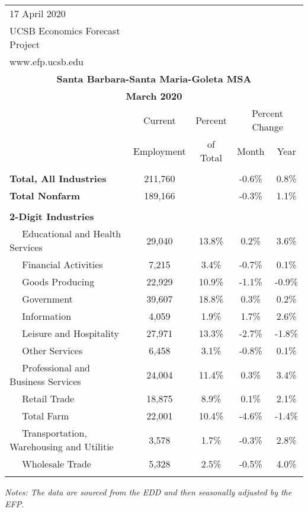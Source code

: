 \documentclass[12pt]{article}
\begin{document}
\begin{landscape}
\begin{table}
\begin{tabular}{|l|c|c|c|c|}
\multicolumn{1}{l}{\small 17 April 2020} & \multicolumn{4}{c}{} \\
\multicolumn{1}{l}{\small UCSB Economics Forecast Project} & \multicolumn{4}{c}{} \\
\multicolumn{1}{l}{\small www.efp.ucsb.edu} & \multicolumn{4}{c}{} \\
\multicolumn{5}{c}{\large \textbf{Santa Barbara-Santa Maria-Goleta MSA}} \\
\multicolumn{5}{c}{\large \textbf{March 2020}} \
\multicolumn{5}{l}{\small Data Seasonally Adjusted} \\ \hline \hline
& Current & Percent & \multicolumn{2}{c}{Percent Change} \vline \\
& Employment & of Total & Month & Year \\ \hline
&&&& \\
\textbf{Total, All Industries} & 211,760 && -0.6\% & 0.8\% \\
\textbf{Total Nonfarm} & 189,166 && -0.3\% & 1.1\% \\
&&&& \\
\textbf{2-Digit Industries} &&&& \\
$\quad$ Educational and Health Services & 29,040 & 13.8\% & 0.2\% & 3.6\% \\
$\quad$ Financial Activities & 7,215 & 3.4\% & -0.7\% & 0.1\% \\
$\quad$ Goods Producing & 22,929 & 10.9\% & -1.1\% & -0.9\% \\
$\quad$ Government & 39,607 & 18.8\% & 0.3\% & 0.2\% \\
$\quad$ Information & 4,059 & 1.9\% & 1.7\% & 2.6\% \\
$\quad$ Leisure and Hospitality & 27,971 & 13.3\% & -2.7\% & -1.8\% \\
$\quad$ Other Services & 6,458 & 3.1\% & -0.8\% & 0.1\% \\
$\quad$ Professional and Business Services & 24,004 & 11.4\% & 0.3\% & 3.4\% \\
$\quad$ Retail Trade & 18,875 & 8.9\% & 0.1\% & 2.1\% \\
$\quad$ Total Farm & 22,001 & 10.4\% & -4.6\% & -1.4\% \\
$\quad$ Transportation, Warehousing and Utilitie & 3,578 & 1.7\% & -0.3\% & 2.8\% \\
$\quad$ Wholesale Trade & 5,328 & 2.5\% & -0.5\% & 4.0\% \\
&&&& \\ \hline \hline
\end{tabular}
\par
\vspace{.5em}
\footnotesize
\textit{Notes: The data are sourced from the EDD and then seasonally adjusted by the EFP.}
\end{table}
\end{landscape}
\end{document}
